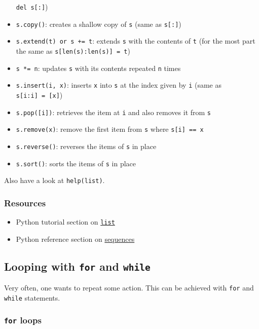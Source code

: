\documentclass[12pt]{article} \newif\ifsolution\solutiontrue %
\begin{document}
\begin{itemize}
  \texttt{del\ s{[}:{]}})
\item
  \texttt{s.copy()}: creates a shallow copy of \texttt{s} (same as
  \texttt{s{[}:{]}})
\item
  \texttt{s.extend(t)\ or\ s\ +=\ t}: extends \texttt{s} with the
  contents of \texttt{t} (for the most part the same as
  \texttt{s{[}len(s):len(s){]}\ =\ t})
\item
  \texttt{s\ *=\ n}: updates \texttt{s} with its contents repeated
  \texttt{n} times
\item
  \texttt{s.insert(i,\ x)}: inserts \texttt{x} into \texttt{s} at the
  index given by \texttt{i} (same as \texttt{s{[}i:i{]}\ =\ {[}x{]}})
\item
  \texttt{s.pop({[}i{]})}: retrieves the item at \texttt{i} and also
  removes it from \texttt{s}
\item
  \texttt{s.remove(x)}: remove the first item from \texttt{s} where
  \texttt{s{[}i{]}\ ==\ x}
\item
  \texttt{s.reverse()}: reverses the items of \texttt{s} in place
\item
  \texttt{s.sort()}: sorts the items of \texttt{s} in place
\end{itemize}

Also have a look at \texttt{help(list)}.

\subsubsection{Resources}\label{resources}

\begin{itemize}
\item
  Python tutorial section on
  \href{https://docs.python.org/3/tutorial/introduction.html\#lists}{\texttt{list}}
\item
  Python reference section on
  \href{https://docs.python.org/3/library/stdtypes.html\#sequence-types-list-tuple-range}{sequences}
\end{itemize}


\subsection{\texorpdfstring{Looping with \texttt{for} and
\texttt{while}}{Looping with for and while}}\label{looping-with-for-and-while}

Very often, one wants to repeat some action. This can be achieved with
\texttt{for} and \texttt{while} statements.

\subsubsection{\texorpdfstring{\texttt{for}
loops}{for loops}}\label{for-loops}
\end{document}
